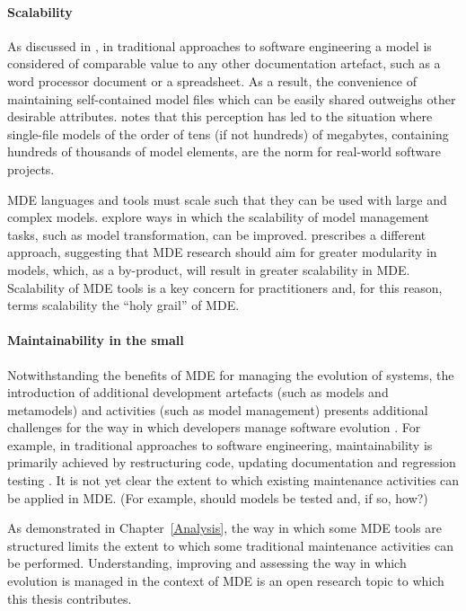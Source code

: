 \paragraph{Scalability} As discussed in \cite{rose10concordance}, in traditional approaches to software engineering a model is considered of comparable value to any other documentation artefact, such as a word processor document or a spreadsheet. As a result, the convenience of maintaining self-contained model files which can be easily shared outweighs other desirable attributes. \cite{kolovos08scalability} notes that this perception has led to the situation where single-file models of the order of tens (if not hundreds) of megabytes, containing hundreds of thousands of model elements, are the norm for real-world software projects.

MDE languages and tools must scale such that they can be used with large and complex models. \cite{hearnden06incremental,rath08live,tratt08change} explore ways in which the scalability of model management tasks, such as model transformation, can be improved. \cite{kolovos08scalability} prescribes a different approach, suggesting that MDE research should aim for greater modularity in models, which, as a by-product, will result in greater scalability in MDE. Scalability of MDE tools is a key concern for practitioners and, for this reason, \cite{kolovos08scalability} terms scalability the ``holy grail'' of MDE.

\paragraph{Maintainability in the small} Notwithstanding the benefits of MDE for managing the evolution of systems, the introduction of additional development artefacts (such as models and metamodels) and activities (such as model management) presents additional challenges for the way in which developers manage software evolution \cite{Mens07}. For example, in traditional approaches to software engineering, maintainability is primarily achieved by restructuring code, updating documentation and regression testing \cite{feathers04working}. It is not yet clear the extent to which existing maintenance activities can be applied in MDE. (For example, should models be tested and, if so, how?)

As demonstrated in Chapter~\ref{Analysis}, the way in which some MDE tools are structured limits the extent to which some traditional maintenance activities can be performed. Understanding, improving and assessing the way in which evolution is managed in the context of MDE is an open research topic to which this thesis contributes. 

